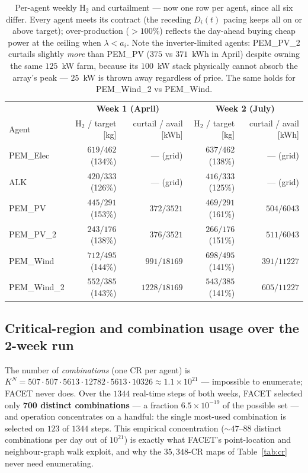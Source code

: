 \documentclass[11pt, letterpaper]{article}
\begin{document}
\begin{table}[H]\centering
\begin{tabular}{lrr|rr}
\toprule
& \multicolumn{2}{c|}{\textbf{Week 1 (April)}} & \multicolumn{2}{c}{\textbf{Week 2 (July)}}\\
Agent & H$_2$ / target [kg] & curtail / avail [kWh] & H$_2$ / target [kg] & curtail / avail [kWh]\\
\midrule
PEM\_Elec    & $619/462$ (134\%) & --- (grid)   & $637/462$ (138\%) & --- (grid)\\
ALK          & $420/333$ (126\%) & --- (grid)   & $416/333$ (125\%) & --- (grid)\\
PEM\_PV      & $445/291$ (153\%) & $372/3521$   & $469/291$ (161\%) & $504/6043$\\
PEM\_PV\_2   & $243/176$ (138\%) & $376/3521$   & $266/176$ (151\%) & $511/6043$\\
PEM\_Wind    & $712/495$ (144\%) & $991/18169$  & $698/495$ (141\%) & $391/11227$\\
PEM\_Wind\_2 & $552/385$ (143\%) & $1228/18169$ & $543/385$ (141\%) & $605/11227$\\
\bottomrule
\end{tabular}
\caption{Per-agent weekly H$_2$ and curtailment --- now one row per agent, since all six differ.
Every agent meets its contract (the receding $D_i(t)$ pacing keeps all on or above target);
over-production ($>\!100\%$) reflects the day-ahead buying cheap power at the ceiling when
$\lambda<a_i$. Note the inverter-limited agents: PEM\_PV\_2 curtails slightly \emph{more} than
PEM\_PV ($375$ vs $371$~kWh in April) despite owning the same $125$~kW farm, because its $100$~kW
stack physically cannot absorb the array's peak --- $25$~kW is thrown away regardless of price.
The same holds for PEM\_Wind\_2 vs PEM\_Wind.}
\end{table}

\subsection{Critical-region and combination usage over the 2-week run}
The number of \emph{combinations} (one CR per agent) is
$K^N=507\cdot507\cdot5613\cdot12782\cdot5613\cdot10326\approx1.1\times10^{21}$ --- impossible to
enumerate; FACET never does. Over the $1344$ real-time steps of both weeks, FACET selected only
\textbf{700 distinct combinations} --- a fraction $6.5\times10^{-19}$ of the possible set --- and
operation concentrates on a handful: the single most-used combination is selected on $123$ of $1344$
steps. This empirical concentration ($\sim\!47$--$88$ distinct combinations per day out of
$10^{21}$) is exactly what FACET's point-location and neighbour-graph walk exploit, and why the
$35{,}348$-CR maps of Table~\ref{tab:cr} never need enumerating.
\end{document}
